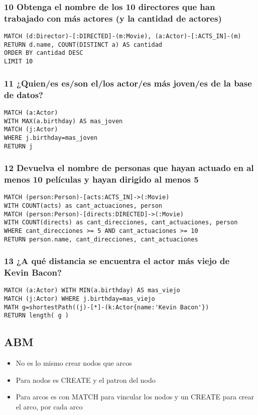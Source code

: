\subsubsection*{10 Obtenga el nombre de los 10 directores que han trabajado con más actores (y la cantidad de actores)}

\begin{verbatim}
MATCH (d:Director)-[:DIRECTED]-(m:Movie), (a:Actor)-[:ACTS_IN]-(m)
RETURN d.name, COUNT(DISTINCT a) AS cantidad
ORDER BY cantidad DESC
LIMIT 10
\end{verbatim}


\subsubsection*{11 ¿Quien/es es/son el/los actor/es más joven/es de la base de datos?}
\begin{verbatim}
MATCH (a:Actor) 
WITH MAX(a.birthday) AS mas_joven
MATCH (j:Actor) 
WHERE j.birthday=mas_joven
RETURN j
\end{verbatim}

\subsubsection*{12 Devuelva el nombre de personas que hayan actuado en al menos 10 películas y hayan dirigido al menos 5}

\begin{verbatim}
MATCH (person:Person)-[acts:ACTS_IN]->(:Movie)
WITH COUNT(acts) as cant_actuaciones, person
MATCH (person:Person)-[directs:DIRECTED]->(:Movie)
WITH COUNT(directs) as cant_direcciones, cant_actuaciones, person
WHERE cant_direcciones >= 5 AND cant_actuaciones >= 10
RETURN person.name, cant_direcciones, cant_actuaciones
\end{verbatim}


\subsubsection*{13 ¿A qué distancia se encuentra el actor más viejo de Kevin Bacon?}
\begin{verbatim}
MATCH (a:Actor) WITH MIN(a.birthday) AS mas_viejo
MATCH (j:Actor) WHERE j.birthday=mas_viejo
MATH g=shortestPath((j)-[*]-(k:Actor{name:'Kevin Bacon'})
RETURN length( g )
\end{verbatim}


\subsection*{ABM}
\begin{itemize}
\item No es lo mismo crear nodos que arcos
\item Para nodos es CREATE y el patron del nodo
\item Para arcos es con MATCH para vincular los nodos y un CREATE para crear el arco, por cada arco
\end{itemize}


\newpage